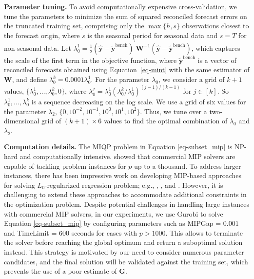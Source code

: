 \documentclass[
  11pt]{article}
\begin{document}
\textbf{Parameter tuning.} To avoid computationally expensive
cross-validation, we tune the parameters to minimize the sum of squared
reconciled forecast errors on the truncated training set, comprising
only the \(\max\{h, s\}\) observations closest to the forecast origin,
where \(s\) is the seasonal period for seasonal data and \(s=T\) for
non-seasonal data. Let
\(\lambda_{0}^{1} = \frac{1}{2}\left(\hat{\bm{y}}-\tilde{\bm{y}}^{\text{bench}}\right)^{\prime} \bm{W}^{-1}\left(\hat{\bm{y}}-\tilde{\bm{y}}^{\text{bench}}\right)\),
which captures the scale of the first term in the objective function,
where \(\tilde{\bm{y}}^{\text{bench}}\) is a vector of reconciled
forecasts obtained using Equation~\ref{eq-mint} with the same estimator
of \(\bm{W}\), and define \(\lambda_{0}^{k} = 0.0001\lambda_{0}^{1}\).
For the parameter \(\lambda_0\), we consider a grid of \(k+1\) values,
\(\{\lambda_{0}^{1},\dots,\lambda_{0}^{k}, 0\}\), where
\(\lambda_{0}^{j} = \lambda_{0}^{1}\left(\lambda_{0}^{k} / \lambda_{0}^{1}\right)^{(j-1) / (k-1)}\)
for \(j \in [k]\). So \(\lambda_{0}^{1},\dots,\lambda_{0}^{k}\) is a
sequence decreasing on the log scale. We use a grid of six values for
the parameter \(\lambda_2\),
\(\{0, 10^{-2}, 10^{-1}, 10^{0}, 10^{1}, 10^{2}\}\). Thus, we tune over
a two-dimensional grid of \((k+1) \times 6\) values to find the optimal
combination of \(\lambda_0\) and \(\lambda_2\).

\textbf{Computation details.} The MIQP problem in Equation
\ref{eq-subset_mip} is NP-hard and computationally intensive.
\citet{Bertsimas2016-ig} showed that commercial MIP solvers are capable
of tackling problem instances for \(p\) up to a thousand. To address
larger instances, there has been impressive work on developing MIP-based
approaches for solving \(L_0\)-regularized regression problem; e.g.,
\citet{Bertsimas2016-ig}, \citet{Hazimeh2020-xd}, and
\citet{Hazimeh2022-hc}. However, it is challenging to extend these
approaches to accommodate additional constraints in the optimization
problem. Despite potential challenges in handling large instances with
commercial MIP solvers, in our experiments, we use Gurobi to solve
Equation \ref{eq-subset_mip} by configuring parameters such as MIPGap =
\(0.001\) and TimeLimit = \(600\) seconds for cases with \(p > 1000\).
This allows to terminate the solver before reaching the global optimum
and return a suboptimal solution instead. This strategy is motivated by
our need to consider numerous parameter candidates, and the final
solution will be validated against the training set, which prevents the
use of a poor estimate of \(\bm{G}\).
\end{document}
